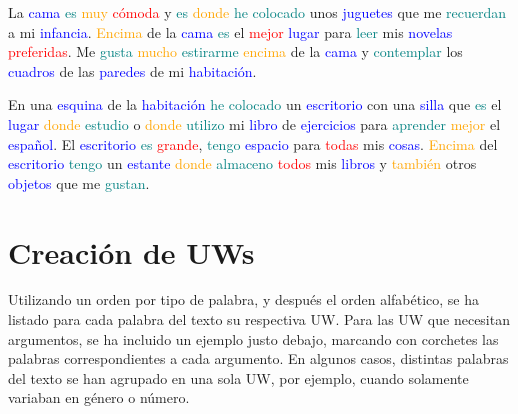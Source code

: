 \documentclass{article}
\begin{document}
La \textcolor{blue}{cama} \textcolor{teal}{es} \textcolor{orange}{muy} \textcolor{red}{cómoda} y \textcolor{teal}{es} \textcolor{orange}{donde} \textcolor{teal}{he colocado} unos \textcolor{blue}{juguetes} que me \textcolor{teal}{recuerdan} a mi \textcolor{blue}{infancia}. \textcolor{orange}{Encima} de la \textcolor{blue}{cama} \textcolor{teal}{es} el \textcolor{red}{mejor} \textcolor{blue}{lugar} para \textcolor{teal}{leer} mis \textcolor{blue}{novelas} \textcolor{red}{preferidas}. Me \textcolor{teal}{gusta} \textcolor{orange}{mucho} \textcolor{teal}{estirarme} \textcolor{orange}{encima} de la \textcolor{blue}{cama} y \textcolor{teal}{contemplar} los \textcolor{blue}{cuadros} de las \textcolor{blue}{paredes} de mi \textcolor{blue}{habitación}.

En una \textcolor{blue}{esquina} de la \textcolor{blue}{habitación} \textcolor{teal}{he colocado} un \textcolor{blue}{escritorio} con una \textcolor{blue}{silla} que \textcolor{teal}{es} el \textcolor{blue}{lugar} \textcolor{orange}{donde} \textcolor{teal}{estudio} o \textcolor{orange}{donde} \textcolor{teal}{utilizo} mi \textcolor{blue}{libro} de \textcolor{blue}{ejercicios} para \textcolor{teal}{aprender} \textcolor{orange}{mejor} el \textcolor{blue}{español}. El \textcolor{blue}{escritorio} \textcolor{teal}{es} \textcolor{red}{grande}, \textcolor{teal}{tengo} \textcolor{blue}{espacio} para \textcolor{red}{todas} mis \textcolor{blue}{cosas}. \textcolor{orange}{Encima} del \textcolor{blue}{escritorio} \textcolor{teal}{tengo} un \textcolor{blue}{estante} \textcolor{orange}{donde} \textcolor{teal}{almaceno} \textcolor{red}{todos} mis \textcolor{blue}{libros} y \textcolor{orange}{también} otros \textcolor{blue}{objetos} que me \textcolor{teal}{gustan}.

\section{Creación de UWs}

Utilizando un orden por tipo de palabra, y después el orden alfabético, se ha listado para cada palabra del texto su respectiva UW. Para las UW que necesitan argumentos, se ha incluido un ejemplo justo debajo, marcando con corchetes las palabras correspondientes a cada argumento. En algunos casos, distintas palabras del texto se han agrupado en una sola UW, por ejemplo, cuando solamente variaban en género o número. 
\end{document}
